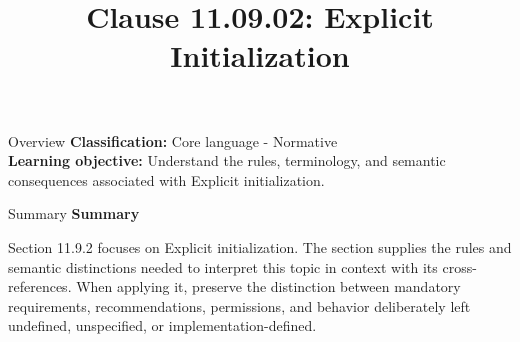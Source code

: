 \documentclass[10pt,letterpaper]{article}
\title{Clause 11.09.02: Explicit Initialization}
\author{}
\date{}
\begin{document}
\maketitle
\begin{CornellOverviewBox}{Overview}
\textbf{Classification:} Core language - Normative\\[2pt]
\textbf{Learning objective:} Understand the rules, terminology, and semantic consequences associated with Explicit initialization.
\end{CornellOverviewBox}\begin{CornellSummaryBox}{Summary}
{\sffamily\bfseries\color{Accent} Summary}\par\vspace{3pt}Section 11.9.2 focuses on Explicit initialization. The section supplies the rules and semantic distinctions needed to interpret this topic in context with its cross-references. When applying it, preserve the distinction between mandatory requirements, recommendations, permissions, and behavior deliberately left undefined, unspecified, or implementation-defined.
\end{CornellSummaryBox}
\end{document}
